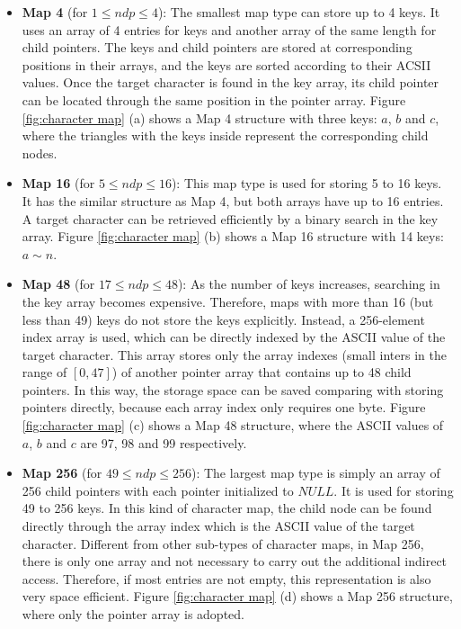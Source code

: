 \documentclass{article}
\begin{document}
\begin{itemize}
\item \textbf{Map 4} (for $1 \leq ndp \leq 4$): The smallest map type
  can store up to 4 keys. It uses an array of 4 entries for keys and
  another array of the same length for child pointers. The keys and
  child pointers are stored at corresponding positions in their
  arrays, and the keys are sorted according to their ACSII
  values. Once the target character is found in the key array, its
  child pointer can be located through the same position in the
  pointer array. Figure \ref{fig:character map} (a) shows a Map 4
  structure with three keys: $a$, $b$ and $c$, where the triangles
  with the keys inside represent the corresponding child nodes.

\item \textbf{Map 16} (for $5 \leq ndp \leq 16$): This map type is
  used for storing 5 to 16 keys. It has the similar structure as Map
  4, but both arrays have up to 16 entries. A target character can be
  retrieved efficiently by a binary search in the key array. Figure
  \ref{fig:character map} (b) shows a Map 16 structure with 14 keys:
  $a \sim n$.

\item \textbf{Map 48} (for $17 \leq ndp \leq 48$): As the number of
  keys increases, searching in the key array becomes
  expensive. Therefore, maps with more than 16 (but less than 49) keys
  do not store the keys explicitly. Instead, a 256-element
  \textsf{index array} is used, which can be directly indexed by the
  ASCII value of the target character. This array stores only the
  \textsf{array indexes} (small inters in the range of $[0,47]$) of
  another pointer array that contains up to 48 child pointers. In this
  way, the storage space can be saved comparing with storing pointers
  directly, because each array index only requires one byte. Figure
  \ref{fig:character map} (c) shows a Map 48 structure, where the
  ASCII values of $a$, $b$ and $c$ are 97, 98 and 99 respectively.

\item \textbf{Map 256} (for $49 \leq ndp \leq 256$): The largest map
  type is simply an array of 256 child pointers with each pointer
  initialized to $NULL$. It is used for storing 49 to 256 keys.  In
  this kind of character map, the child node can be found directly
  through the array index which is the ASCII value of the target
  character. Different from other sub-types of character maps, in Map
  256, there is only one array and not necessary to carry out the
  additional indirect access. Therefore, if most entries are not
  empty, this representation is also very space efficient. Figure
  \ref{fig:character map} (d) shows a Map 256 structure, where only
  the pointer array is adopted.
\end{itemize}
\end{document}

